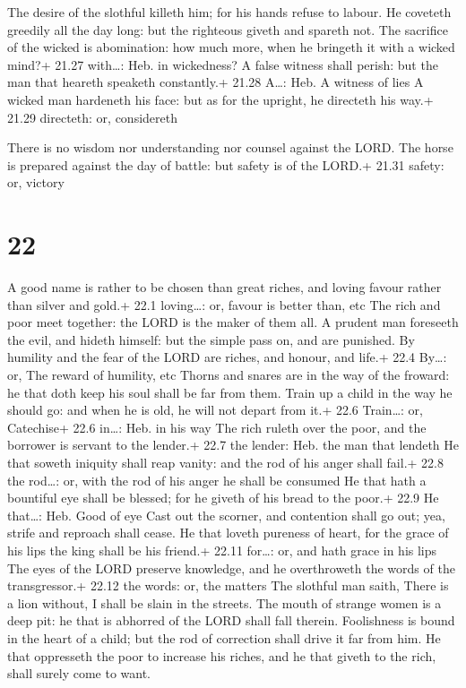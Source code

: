  The desire of the slothful killeth him; for his hands
refuse to labour.  He coveteth greedily all the day long:
but the righteous giveth and spareth not.  The sacrifice of
the wicked is abomination: how much more, when he bringeth it with a
wicked mind?+ 21.27 with\ldots: Heb. in wickedness?  A
false witness shall perish: but the man that heareth speaketh
constantly.+ 21.28 A\ldots: Heb. A witness of lies  A
wicked man hardeneth his face: but as for the upright, he directeth his
way.+ 21.29 directeth: or, considereth

 There is no wisdom nor understanding nor counsel against
the LORD.  The horse is prepared against the day of battle:
but safety is of the LORD.+ 21.31 safety: or, victory

\hypertarget{section-21}{%
\section{22}\label{section-21}}

 A good name is rather to be chosen than great riches, and
loving favour rather than silver and gold.+ 22.1 loving\ldots: or,
favour is better than, etc  The rich and poor meet together:
the LORD is the maker of them all.  A prudent man foreseeth
the evil, and hideth himself: but the simple pass on, and are punished.
 By humility and the fear of the LORD are riches, and
honour, and life.+ 22.4 By\ldots: or, The reward of humility, etc
 Thorns and snares are in the way of the froward: he that
doth keep his soul shall be far from them.  Train up a child
in the way he should go: and when he is old, he will not depart from
it.+ 22.6 Train\ldots: or, Catechise+ 22.6 in\ldots: Heb. in his way
 The rich ruleth over the poor, and the borrower is servant
to the lender.+ 22.7 the lender: Heb. the man that lendeth 
He that soweth iniquity shall reap vanity: and the rod of his anger
shall fail.+ 22.8 the rod\ldots: or, with the rod of his anger he shall
be consumed  He that hath a bountiful eye shall be blessed;
for he giveth of his bread to the poor.+ 22.9 He that\ldots: Heb. Good
of eye  Cast out the scorner, and contention shall go out;
yea, strife and reproach shall cease.  He that loveth
pureness of heart, for the grace of his lips the king shall be his
friend.+ 22.11 for\ldots: or, and hath grace in his lips 
The eyes of the LORD preserve knowledge, and he overthroweth the words
of the transgressor.+ 22.12 the words: or, the matters  The
slothful man saith, There is a lion without, I shall be slain in the
streets.  The mouth of strange women is a deep pit: he that
is abhorred of the LORD shall fall therein.  Foolishness is
bound in the heart of a child; but the rod of correction shall drive it
far from him.  He that oppresseth the poor to increase his
riches, and he that giveth to the rich, shall surely come to want.

